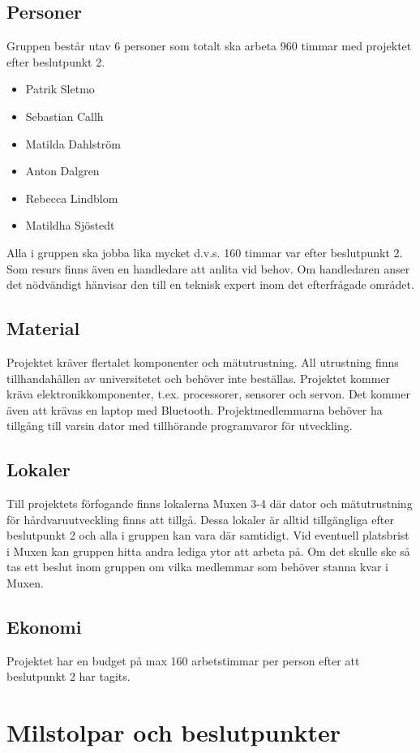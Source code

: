 \documentclass{article}
\begin{document}
\subsection{Personer}
Gruppen består utav 6 personer som totalt ska arbeta 960 timmar med projektet efter beslutpunkt 2.
\begin{itemize}
  \item Patrik Sletmo
  \item Sebastian Callh
  \item Matilda Dahlström
  \item Anton Dalgren
  \item Rebecca Lindblom
  \item Matildha Sjöstedt
\end{itemize}
Alla i gruppen ska jobba lika mycket d.v.s. 160 timmar var efter beslutpunkt 2.
\newline\newline
Som resurs finns även en handledare att anlita vid behov. Om handledaren anser det nödvändigt hänvisar den till en teknisk expert inom det efterfrågade området. 
\subsection{Material}
Projektet kräver flertalet komponenter och mätutrustning. All utrustning finns tillhandahållen av universitetet och behöver inte beställas. Projektet kommer kräva elektronikkomponenter, t.ex. processorer, sensorer och servon. Det kommer även att krävas en laptop med Bluetooth. Projektmedlemmarna behöver ha tillgång till varsin dator med tillhörande programvaror för utveckling.   
\subsection{Lokaler}
Till projektets förfogande finns lokalerna Muxen 3-4 där dator och mätutrustning för hårdvaruutveckling finns att tillgå. Dessa lokaler är alltid tillgängliga efter beslutpunkt 2 och alla i gruppen kan vara där samtidigt. Vid eventuell platsbrist i Muxen kan gruppen hitta andra lediga ytor att arbeta på. Om det skulle ske så tas ett beslut inom gruppen om vilka medlemmar som behöver stanna kvar i Muxen.
\subsection{Ekonomi}
Projektet har en budget på max 160 arbetstimmar per person efter att beslutpunkt 2 har tagits.

\section{Milstolpar och beslutpunkter}
\end{document}
